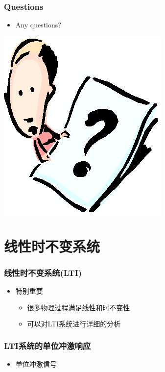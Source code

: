 \documentclass[CJKutf8,dvipsnames,table]{beamer}
\begin{document}
\begin{CJK*}{UTF8}{song}
  \begin{frame}
    \frametitle{Questions}
    \begin{itemize}
    \item Any questions?
    \end{itemize}
    \begin{center}
      \includegraphics[scale=.5]{question}
    \end{center}
  \end{frame}    
  
  \section{线性时不变系统}
  
  \begin{frame}
    \frametitle{线性时不变系统(LTI)}
    \begin{itemize}
    \item 特别重要
        \begin{itemize}
        \item 很多物理过程满足线性和时不变性
        \item 可以对LTI系统进行详细的分析
        \end{itemize}   
    \end{itemize} 
  \end{frame} 
  
  \begin{frame}
    \frametitle{LTI系统的单位冲激响应}
    \begin{itemize}
    \item 单位冲激信号
    

\end{itemize}
\end{frame}
\end{CJK*}
\end{document}
